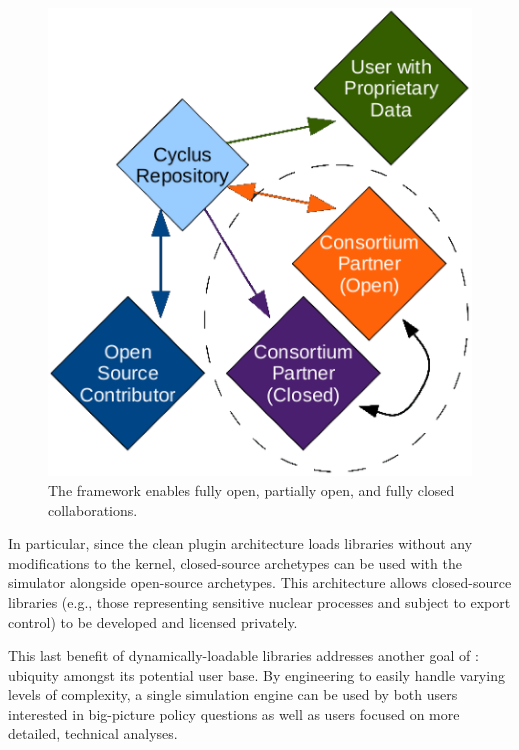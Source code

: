 \begin{figure}[htbp!]
\begin{center}
\includegraphics{./images/modifiedopen.eps}
\end{center}
\caption{The \Cyclus framework enables fully open, partially open, and fully
closed collaborations\cite{wilson_cyclus:_2012}.}
\label{fig:modifiedopen}
\end{figure}

In particular, since the clean plugin architecture loads libraries without any
modifications to the \Cyclus kernel, closed-source archetypes can be used with
the simulator alongside open-source archetypes. This architecture
allows closed-source libraries (e.g., those representing sensitive nuclear
processes and subject to export control) to be developed and licensed privately.

This last benefit of dynamically-loadable libraries addresses
another goal of \Cyclus: ubiquity amongst its potential user base. By
engineering \Cyclus to easily handle varying levels of complexity, a single
simulation engine can be used by both users interested in big-picture policy
questions as well as users focused on more detailed, technical
analyses.

